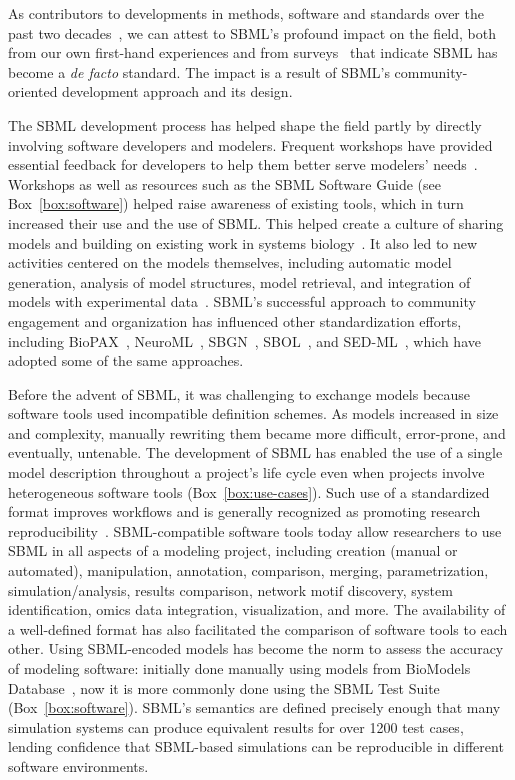 \documentclass{sbml-paper}
\begin{document}
As contributors to developments in methods, software and standards over the past two decades~\citep{Hucka2015promotinga, Brazma2006standards}, we can attest to SBML's profound impact on the field, both from our own first-hand experiences and from surveys~\citep{Klipp2007systems} that indicate SBML has become a \emph{de facto} standard.  The impact is a result of SBML's community-oriented development approach and its design.

The SBML development process has helped shape the field partly by directly involving software developers and modelers.  Frequent workshops have provided essential feedback for developers to help them better serve modelers' needs~\citep[e.g.,][]{waltemath2014meeting}.  Workshops as well as resources such as the SBML Software Guide (see Box~\ref{box:software}) helped raise awareness of existing tools, which in turn increased their use and the use of SBML.  This helped create a culture of sharing models and building on existing work in systems biology~\citep{stanford2015evolution}.  It also led to new activities centered on the models themselves, including automatic model generation, analysis of model structures, model retrieval, and integration of models with experimental data~\citep{Draeger2014}.  SBML's successful approach to community engagement and organization has influenced other standardization efforts, including BioPAX~\citep{Demir2010}, NeuroML~\citep{Gleeson2010}, SBGN~\citep{VanIersel2012}, SBOL~\citep{Roehner2016}, and SED-ML~\citep{waltemath2011reproducible}, which have adopted some of the same approaches.

Before the advent of SBML, it was challenging to exchange models because software tools used incompatible definition schemes.  As models increased in size and complexity, manually rewriting them became more difficult, error-prone, and eventually, untenable.  The development of SBML has enabled the use of a single model description throughout a project's life cycle even when projects involve heterogeneous software tools (Box~\ref{box:use-cases}).  Such use of a standardized format improves workflows and is generally recognized as promoting research reproducibility~\citep{Sandve2013ten, Mendes2018reproducible}.  SBML-compatible software tools today allow researchers to use SBML in all aspects of a modeling project, including creation (manual or automated), manipulation, annotation, comparison, merging, parametrization, simulation/analysis, results comparison, network motif discovery, system identification, omics data integration, visualization, and more.  The availability of a well-defined format has also facilitated the comparison of software tools to each other.  Using SBML-encoded models has become the norm to assess the accuracy of modeling software: initially done manually using models from BioModels Database~\citep{bergmann2008comparing}, now it is more commonly done using the SBML Test Suite (Box~\ref{box:software}).  SBML's semantics are defined precisely enough that many simulation systems can produce equivalent results for over 1200 test cases, lending confidence that SBML-based simulations can be reproducible in different software environments.
\end{document}
